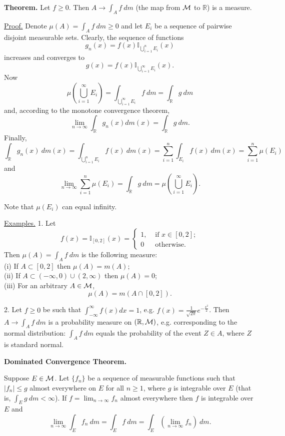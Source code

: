 \documentclass[a4paper,10pt]{article}
\def\RR{\mathbb{R}}
\def\II{\mathbb{I}}
\newcommand{\1}[1]{\mathbf{1}_{\{#1\}}}
\begin{document}
{\bf Theorem.} Let $f\ge 0$. Then $A\to\displaystyle\int_A f~dm$ (the map from $\cal M$ to $\RR$) is a measure.
\vspace{3mm}

\underline{Proof.} Denote $\mu(A)=\int_A f~dm\ge 0$ and let $E_i$ be a sequence of pairwise disjoint measurable sets. Clearly, the sequence of functions
  $$g_n(x)=f(x)\II_{\bigcup_{i=1}^n E_i}(x)$$
increases and converges to
  $$g(x)=f(x)\II_{\bigcup_{i=1}^\infty E_i}(x).$$
Now
  $$\mu\left(\bigcup_{i=1}^\infty E_i\right)=\int_{\bigcup_{i=1}^\infty E_i} f~dm=\int_\RR g~dm$$
and, according to the monotone convergence theorem,
  $$\lim_{n\to\infty} \int_\RR g_n(x) dm(x)=\int_\RR g~dm.$$
Finally,
  $$\int_\RR g_n(x)~dm(x)=\int_{\bigcup_{i=1}^n E_i} f(x)~ dm(x)=\sum_{i=1}^n \int_{E_i} f(x)~ dm(x)=\sum_{i=1}^n \mu(E_i)$$
and
  $$\lim_{n\to\infty} \sum_{i=1}^n \mu(E_i)=\int_\RR g~dm=\mu\left(\bigcup_{i=1}^\infty E_i\right).$$
\blacksquare

Note that $\mu(E_i)$ can equal infinity.\vspace{3mm}

\underline{Examples.} 1. Let
  $$f(x)=\II_{[0,2]}(x)=\left\{\begin{array}{ll} 1, & \mbox{ if } x\in[0,2]; \\ 0 & \mbox{ otherwise}. \end{array}\right.$$
Then $\mu(A)=\int_A f~dm$ is the following measure:\\
(i) If $A\subset [0,2]$ then $\mu(A)=m(A)$;\\
(ii) If $A\subset (-\infty,0)\cup(2,\infty)$ then $\mu(A)=0$;\\
(iii) For an arbitrary $A\in{\cal M}$,
  $$\mu(A)=m(A\cap [0,2]).$$

2. Let $f\ge 0$ be such that $\int_{-\infty}^\infty f(x) dx =1$, e.g. $f(x)=\frac{1}{\sqrt{2\pi}} e^{-\frac{x^2}{2}}$. Then $A\to\int_A f~dm$ is a probability measure on $(\RR,{\cal M})$, e.g. corresponding to the normal distribution: $\int_A f~dm$ equals the probability of the event $Z\in A$, where $Z$ is standard normal.\vspace{3mm}

{\bf Dominated Convergence Theorem.}\vspace{3mm}

Suppose $E\in{\cal M}$. Let $\{f_n\}$ be a sequence of measurable functions such that $|f_n|\le g$ almost everywhere on $E$ for all $n\ge 1$, where $g$ is integrable over $E$ (that is, $\int_E g~dm<\infty$). If $f=\lim_{n\to\infty} f_n$ almost everywhere then $f$ is integrable over $E$ and
  $$\lim_{n\to\infty} \int_E f_n~dm=\int_E f~dm=\int_E\left(\lim_{n\to\infty} f_n\right)~ dm.$$
\vspace{3mm}
\end{document}
